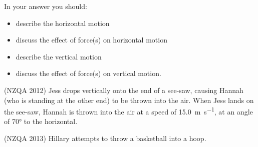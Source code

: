 \documentclass[a4paper]{exam}
\begin{document}
\begin{questions}
              In your answer you should:
              \begin{itemize}
                \item describe the horizontal motion
                \item discuss the effect of force(s) on horizontal motion
                \item describe the vertical motion
                \item discuss the effect of force(s) on vertical motion.
              \end{itemize}
    \question (NZQA 2012) Jess drops vertically onto the end of a see-saw, causing Hannah (who is standing
              at the other end) to be thrown into the air. When Jess lands on the see-saw, Hannah is thrown into
              the air at a speed of \SI{15.0}{\metre\per\second}, at an angle of \ang{70} to the horizontal.
    \question (NZQA 2013) Hillary attempts to throw a basketball into a hoop.
\end{questions}
\end{document}
